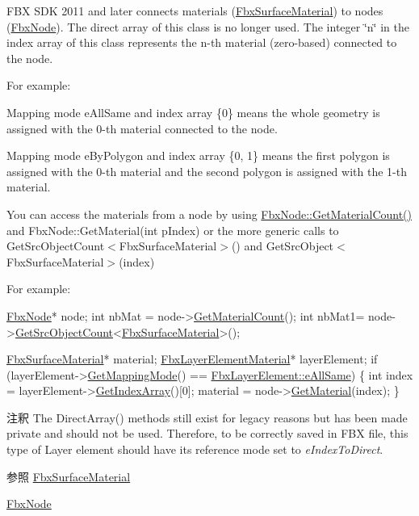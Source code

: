 F\+BX S\+DK 2011 and later connects materials (\hyperlink{class_fbx_surface_material}{Fbx\+Surface\+Material}) to nodes (\hyperlink{class_fbx_node}{Fbx\+Node}). The direct array of this class is no longer used. The integer \char`\"{}n\char`\"{} in the index array of this class represents the n-\/th material (zero-\/based) connected to the node.

For example\+:

Mapping mode e\+All\+Same and index array \{0\} means the whole geometry is assigned with the 0-\/th material connected to the node.

Mapping mode e\+By\+Polygon and index array \{0, 1\} means the first polygon is assigned with the 0-\/th material and the second polygon is assigned with the 1-\/th material.

You can access the materials from a node by using \hyperlink{class_fbx_node_a00fabc04c839f665fa5d4a0b49859745}{Fbx\+Node\+::\+Get\+Material\+Count()} and Fbx\+Node\+::\+Get\+Material(int p\+Index) or the more generic calls to Get\+Src\+Object\+Count$<$\+Fbx\+Surface\+Material$>$() and Get\+Src\+Object$<$\+Fbx\+Surface\+Material$>$(index)

For example\+:


\begin{DoxyCode}
\hyperlink{class_fbx_node}{FbxNode}* node;
\textcolor{keywordtype}{int} nbMat = node->\hyperlink{class_fbx_node_a00fabc04c839f665fa5d4a0b49859745}{GetMaterialCount}();
\textcolor{keywordtype}{int} nbMat1= node->\hyperlink{class_fbx_object_a5fce56e85d5e0568243a5df99dabb42f}{GetSrcObjectCount}<\hyperlink{class_fbx_surface_material}{FbxSurfaceMaterial}>();

\hyperlink{class_fbx_surface_material}{FbxSurfaceMaterial}* material;
\hyperlink{class_fbx_layer_element_material}{FbxLayerElementMaterial}* layerElement;
\textcolor{keywordflow}{if} (layerElement->\hyperlink{class_fbx_layer_element_a3b20bf41d0b5abc9661b8b93e033cddb}{GetMappingMode}() == \hyperlink{class_fbx_layer_element_a5a40e95db30ae9f94611dc3f1568af26ab42522efc125ff87d80ba08267a8624f}{FbxLayerElement::eAllSame})
\{
    \textcolor{keywordtype}{int} index = layerElement->\hyperlink{class_fbx_layer_element_template_ab1494495d1944eb4b20c4c97abd6358c}{GetIndexArray}()[0];
    material = node->\hyperlink{class_fbx_node_aa89bfed69b0fe26ee03708931fbda9c2}{GetMaterial}(index);
\}
\end{DoxyCode}


\begin{DoxyRemark}{注釈}
The Direct\+Array() methods still exist for legacy reasons but has been made private and should not be used. Therefore, to be correctly saved in F\+BX file, this type of Layer element should have its reference mode set to {\itshape e\+Index\+To\+Direct}.
\end{DoxyRemark}
\begin{DoxySeeAlso}{参照}
\hyperlink{class_fbx_surface_material}{Fbx\+Surface\+Material} 

\hyperlink{class_fbx_node}{Fbx\+Node} 
\end{DoxySeeAlso}


